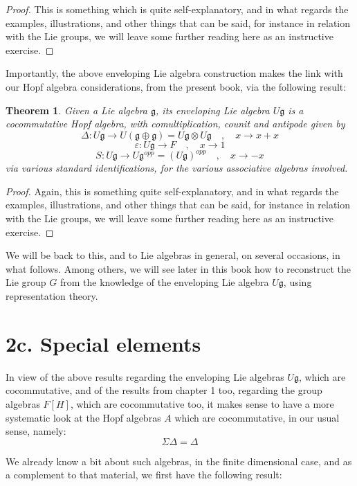 \documentclass[12pt]{amsbook}
\newtheorem{theorem}{Theorem}[chapter]
\begin{document}
\begin{proof}
This is something which is quite self-explanatory, and in what regards the examples, illustrations, and other things that can be said, for instance in relation with the Lie groups, we will leave some further reading here as an instructive exercise.
\end{proof}

Importantly, the above enveloping Lie algebra construction makes the link with our Hopf algebra considerations, from the present book, via the following result:

\begin{theorem}
Given a Lie algebra $\mathfrak g$, its enveloping Lie algebra $U\mathfrak g$ is a cocommutative Hopf algebra, with comultiplication, counit and antipode given by
$$\Delta:U\mathfrak g\to U(\mathfrak g\oplus\mathfrak g)=U\mathfrak g\otimes U\mathfrak g\quad,\quad x\to x+x$$
$$\varepsilon:U\mathfrak g\to F\quad,\quad x\to 1$$
$$S:U\mathfrak g\to U\mathfrak g^{opp}=(U\mathfrak g)^{opp}\quad,\quad x\to-x$$
via various standard identifications, for the various associative algebras involved.
\end{theorem}

\begin{proof}
Again, this is something quite self-explanatory, and in what regards the examples, illustrations, and other things that can be said, for instance in relation with the Lie groups, we will leave some further reading here as an instructive exercise.
\end{proof}

We will be back to this, and to Lie algebras in general, on several occasions, in what follows. Among others, we will see later in this book how to reconstruct the Lie group $G$ from the knowledge of the enveloping Lie algebra $U\mathfrak g$, using representation theory.

\section*{2c. Special elements}

In view of the above results regarding the enveloping Lie algebras $U\mathfrak g$, which are cocommutative, and of the results from chapter 1 too, regarding the group algebras $F[H]$, which are cocommutative too, it makes sense to have a more systematic look at the Hopf algebras $A$ which are cocommutative, in our usual sense, namely:
$$\Sigma\Delta=\Delta$$

We already know a bit about such algebras, in the finite dimensional case, and as a complement to that material, we first have the following result:
\end{document}
